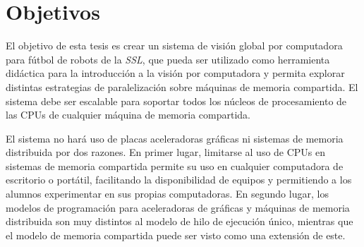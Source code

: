 
\section{Objetivos}

\label{objetivos}

El objetivo de esta tesis es crear un sistema de visión global por computadora
para fútbol de robots de la \emph{SSL}, que pueda ser utilizado como herramienta
didáctica para la introducción a la visión por computadora y permita explorar
distintas estrategias de paralelización sobre máquinas de memoria compartida. El
sistema debe ser escalable para soportar todos los núcleos de procesamiento de
las CPUs de cualquier máquina de memoria compartida.

El sistema no hará uso de placas aceleradoras gráficas ni sistemas de memoria distribuida
por dos razones. En primer lugar, limitarse al uso de CPUs en sistemas de
memoria compartida permite su uso en cualquier computadora de escritorio o
portátil, facilitando la disponibilidad de equipos y permitiendo a los alumnos
experimentar en sus propias computadoras. En segundo lugar, los modelos de
programación para aceleradoras de gráficas y máquinas de memoria distribuida son
muy distintos al modelo de hilo de ejecución único, mientras que el modelo de
memoria compartida puede ser visto como una extensión de este.
